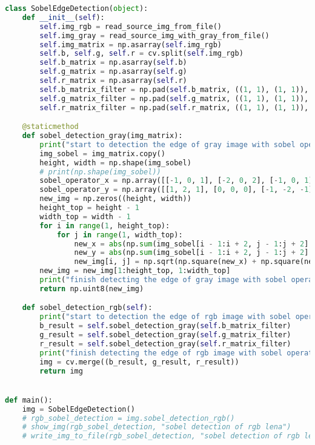 \documentclass{hitreport}
\begin{document}
\begin{appendices}
\begin{lstlisting}[language=python]
class SobelEdgeDetection(object):
    def __init__(self):
        self.img_rgb = read_source_img_from_file()
        self.img_gray = read_source_img_with_gray_from_file()
        self.img_matrix = np.asarray(self.img_rgb)
        self.b, self.g, self.r = cv.split(self.img_rgb)
        self.b_matrix = np.asarray(self.b)
        self.g_matrix = np.asarray(self.g)
        self.r_matrix = np.asarray(self.r)
        self.b_matrix_filter = np.pad(self.b_matrix, ((1, 1), (1, 1)), 'constant', constant_values=(0, 0))
        self.g_matrix_filter = np.pad(self.g_matrix, ((1, 1), (1, 1)), 'constant', constant_values=(0, 0))
        self.r_matrix_filter = np.pad(self.r_matrix, ((1, 1), (1, 1)), 'constant', constant_values=(0, 0))

    @staticmethod
    def sobel_detection_gray(img_matrix):
        print("start to detection the edge of gray image with sobel operator")
        img_sobel = img_matrix.copy()
        height, width = np.shape(img_sobel)
        # print(np.shape(img_sobel))
        sobel_operator_x = np.array([[-1, 0, 1], [-2, 0, 2], [-1, 0, 1]])
        sobel_operator_y = np.array([[1, 2, 1], [0, 0, 0], [-1, -2, -1]])
        new_img = np.zeros((height, width))
        height_top = height - 1
        width_top = width - 1
        for i in range(1, height_top):
            for j in range(1, width_top):
                new_x = abs(np.sum(img_sobel[i - 1:i + 2, j - 1:j + 2] * sobel_operator_x))
                new_y = abs(np.sum(img_sobel[i - 1:i + 2, j - 1:j + 2] * sobel_operator_y))
                new_img[i, j] = np.sqrt(np.square(new_x) + np.square(new_y))
        new_img = new_img[1:height_top, 1:width_top]
        print("finish detecting the edge of gray image with sobel operator")
        return np.uint8(new_img)

    def sobel_detection_rgb(self):
        print("start to detection the edge of rgb image with sobel operator")
        b_result = self.sobel_detection_gray(self.b_matrix_filter)
        g_result = self.sobel_detection_gray(self.g_matrix_filter)
        r_result = self.sobel_detection_gray(self.r_matrix_filter)
        print("finish detecting the edge of rgb image with sobel operator")
        img = cv.merge((b_result, g_result, r_result))
        return img


def main():
    img = SobelEdgeDetection()
    # rgb_sobel_detection = img.sobel_detection_rgb()
    # show_img(rgb_sobel_detection, "sobel detection of rgb lena")
    # write_img_to_file(rgb_sobel_detection, "sobel detection of rgb lena")


\end{lstlisting}
\end{appendices}
\end{document}
